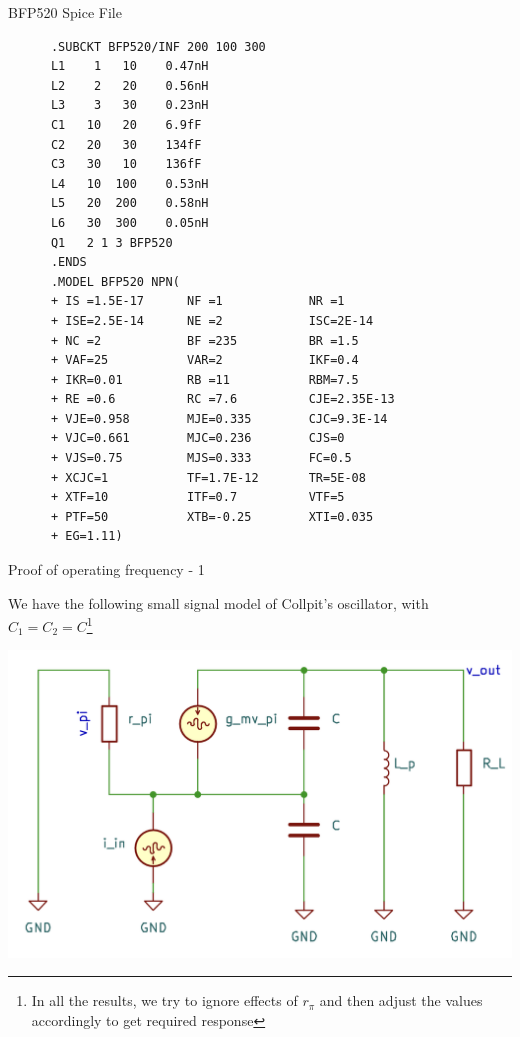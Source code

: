 \documentclass{beamer}
\begin{document}
\begin{frame}[fragile]{BFP520 Spice File}
  \begin{tiny}
    \begin{lstlisting}
      .SUBCKT BFP520/INF 200 100 300
      L1    1   10    0.47nH
      L2    2   20    0.56nH
      L3    3   30    0.23nH
      C1   10   20    6.9fF
      C2   20   30    134fF
      C3   30   10    136fF
      L4   10  100    0.53nH
      L5   20  200    0.58nH
      L6   30  300    0.05nH
      Q1   2 1 3 BFP520
      .ENDS
      .MODEL BFP520 NPN(
      + IS =1.5E-17      NF =1            NR =1
      + ISE=2.5E-14      NE =2            ISC=2E-14
      + NC =2            BF =235          BR =1.5
      + VAF=25           VAR=2            IKF=0.4
      + IKR=0.01         RB =11           RBM=7.5
      + RE =0.6          RC =7.6          CJE=2.35E-13
      + VJE=0.958        MJE=0.335        CJC=9.3E-14
      + VJC=0.661        MJC=0.236        CJS=0
      + VJS=0.75         MJS=0.333        FC=0.5
      + XCJC=1           TF=1.7E-12       TR=5E-08
      + XTF=10           ITF=0.7          VTF=5
      + PTF=50           XTB=-0.25        XTI=0.035
      + EG=1.11)
    \end{lstlisting}
  \end{tiny}
  
  \end{frame}




\begin{frame}{Proof of operating frequency - 1}

  We have the following small signal model of Collpit's oscillator, with \(C_1 = C_2 = C\)\footnote{In all the results, we try to ignore effects of \(r_\pi\) and then adjust the values accordingly to get required response}
  \begin{center}
    \includegraphics[width = 0.7\linewidth]{images/ssm.png}
  \end{center}
  
\end{frame}
\end{document}
